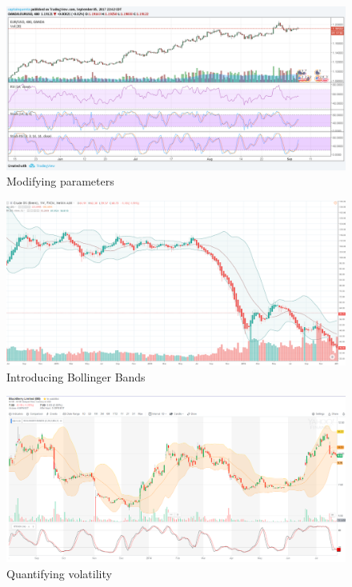 \documentclass{article}
\begin{document}
\vspace{10pt}

\begin{figure}[!htb]
    \centering
    \includegraphics[width=\textwidth]{imgs/84.png}
    \caption{Modifying parameters}
\end{figure}

\vspace{10pt}

\begin{figure}[!htb]
    \centering
    \includegraphics[width=\textwidth]{imgs/85.png}
    \caption{Introducing Bollinger Bands}
\end{figure}

\vspace{10pt}

\begin{figure}[!htb]
    \centering
    \includegraphics[width=\textwidth]{imgs/86.png}
    \caption{Quantifying volatility}
\end{figure}
\end{document}
